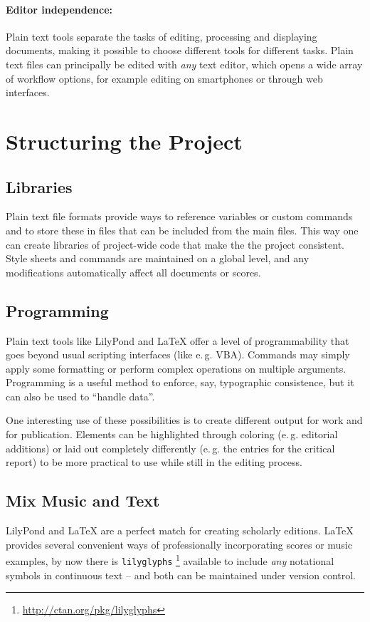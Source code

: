 \documentclass[11pt,a4paper]{article}
\begin{document}
\paragraph{Editor independence:}
Plain text tools separate the tasks of editing, processing and displaying documents,
making it possible to choose different tools for different tasks. Plain text files
can principally be edited with \emph{any} text editor, which opens a wide array of
workflow options, for example editing on smartphones or through web interfaces.

\section{Structuring the Project}

\subsection{Libraries}
Plain text file formats provide ways to reference variables or custom
commands and to store these in files that can be included from the
main files. This way one can create libraries of project-wide code
that make the the project consistent. Style sheets and commands are
maintained on a global level, and any modifications automatically
affect all documents or scores.

\subsection{Programming}
Plain text tools like LilyPond and \LaTeX{} offer a level of programmability that
goes beyond usual scripting interfaces (like e.\,g. VBA). Commands may simply apply
some formatting or perform complex operations on multiple arguments.
Programming is a useful method to enforce, say, typographic consistence, but it can
also be used to “handle data”.

One interesting use of these possibilities is to create different output for work and for
publication. Elements can be highlighted through coloring (e.\,g. editorial additions)
or laid out completely differently (e.\,g. the entries for the critical report) to be
more practical to use while still in the editing process.

\subsection{Mix Music and Text}
LilyPond and \LaTeX{} are a perfect match for creating scholarly editions. \LaTeX{}
provides several convenient ways of professionally incorporating scores or music examples,
by now there is \texttt{lilyglyphs}%
\footnote{\url{http://ctan.org/pkg/lilyglyphs}}
available to include \emph{any} notational symbols in continuous text -- and both
can be maintained under version control.
\end{document}
